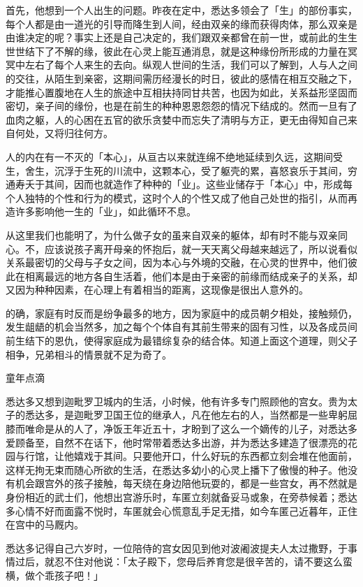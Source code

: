 \documentclass[12pt,twoside,openany]{book}
\begin{document}
首先，他想到一个人出生的问题。昨夜在定中，悉达多领会了「生」的部份事实，每个人都是由一道光的引导而降生到人间，经由双亲的缘而获得肉体，那么双亲是由谁决定的呢？事实上还是自己决定的，我们跟双亲都曾在前一世，或前此的生生世世结下了不解的缘，彼此在心灵上能互通消息，就是这种缘份所形成的力量在冥冥中左右了每个人来生的去向。纵观人世间的生活，我们可以了解到，人与人之间的交往，从陌生到亲密，这期间需历经漫长的时日，彼此的感情在相互交融之下，才能推心置腹地在人生的旅途中互相扶持同甘共苦，也因为如此，关系益形坚固而密切，亲子间的缘份，也是在前生的种种恩恩怨怨的情况下结成的。然而一旦有了血肉之躯，人的心困在五官的欲乐贪婪中而忘失了清明与方正，更无由得知自己来自何处，又将归往何方。

人的内在有一不灭的「本心」，从亘古以来就连绵不绝地延续到久远，这期间受生，舍生，沉浮于生死的川流中，这颗本心，受了躯壳的累，喜怒哀乐于其间，穷通寿夭于其间，因而也就造作了种种的「业」。这些业储存于「本心」中，形成每个人独特的个性和行为的模式，这时个人的个性又成了他自己处世的指引，从而再造许多影响他一生的「业」，如此循环不息。

从这里我们也能明了，为什么做子女的虽来自双亲的躯体，却有时不能与双亲同心。不，应该说孩子离开母亲的怀抱后，就一天天离父母越来越远了，所以说看似关系最密切的父母与子女之间，因为本心与外境的交融，在心灵的世界中，他们彼此在相离最远的地方各自生活着，他们本是由于亲密的前缘而结成亲子的关系，却又因为种种因素，在心理上有着相当的距离，这现像是很出人意外的。

的确，家庭有时反而是纷争最多的地方，因为家庭中的成员朝夕相处，接触频仍，发生龃龉的机会当然多，加之每个个体自有其前生带来的固有习性，以及各成员间前生结下的恩仇，使得家庭成为最错综复杂的结合体。知道上面这个道理，则父子相争，兄弟相斗的情景就不足为奇了。

童年点滴

悉达多又想到迦毗罗卫城内的生活，小时候，他有许多专门照顾他的宫女。贵为太子的悉达多，是迦毗罗卫国王位的继承人，凡在他左右的人，当然都是一些卑躬屈膝而唯命是从的人了，净饭王年近五十，才盼到了这么一个嫡传的儿子，对悉达多爱顾备至，自然不在话下，他时常带着悉达多出游，并为悉达多建造了很漂亮的花园与行馆，让他嬉戏于其间。只要他开口，什么好玩的东西都立刻会堆在他面前，这样无拘无束而随心所欲的生活，在悉达多幼小的心灵上播下了傲慢的种子。他没有机会跟宫外的孩子接触，每天绕在身边陪他玩耍的，都是一些宫女，再不然就是身份相近的武士们，他想出宫游乐时，车匿立刻就备妥马或象，在旁恭候着；悉达多心情不好而面露不悦时，车匿就会心慌意乱手足无措，如今车匿己近暮年，正住在宫中的马厩内。

悉达多记得自己六岁时，一位陪侍的宫女因见到他对波阇波提夫人太过撒野，于事情过后，就忍不住对他说：「太子殿下，您母后养育您是很辛苦的，请不要这么蛮横，做个乖孩子吧！」
\end{document}
